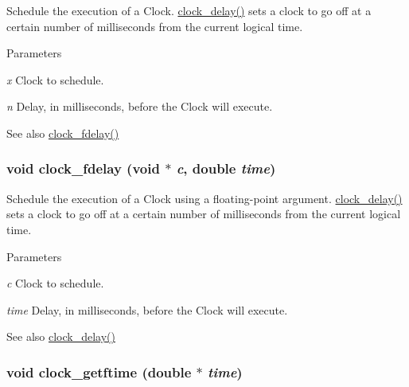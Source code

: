 Schedule the execution of a Clock. \hyperlink{group__clocks_ga9ac56d198904627333de740743086920}{clock\_\-delay()} sets a clock to go off at a certain number of milliseconds from the current logical time.


\begin{DoxyParams}{Parameters}
\item[{\em x}]Clock to schedule. \item[{\em n}]Delay, in milliseconds, before the Clock will execute. \end{DoxyParams}
\begin{DoxySeeAlso}{See also}
\hyperlink{group__clocks_ga61719f0e0379fffbe79ae2bd5699b66f}{clock\_\-fdelay()} 
\end{DoxySeeAlso}
\hypertarget{group__clocks_ga61719f0e0379fffbe79ae2bd5699b66f}{
\subsubsection[{clock\_\-fdelay}]{\setlength{\rightskip}{0pt plus 5cm}void clock\_\-fdelay (void $\ast$ {\em c}, \/  double {\em time})}}
\label{group__clocks_ga61719f0e0379fffbe79ae2bd5699b66f}


Schedule the execution of a Clock using a floating-\/point argument. \hyperlink{group__clocks_ga9ac56d198904627333de740743086920}{clock\_\-delay()} sets a clock to go off at a certain number of milliseconds from the current logical time.


\begin{DoxyParams}{Parameters}
\item[{\em c}]Clock to schedule. \item[{\em time}]Delay, in milliseconds, before the Clock will execute. \end{DoxyParams}
\begin{DoxySeeAlso}{See also}
\hyperlink{group__clocks_ga9ac56d198904627333de740743086920}{clock\_\-delay()} 
\end{DoxySeeAlso}
\hypertarget{group__clocks_ga04a49876d29036406f857cf22b99d9ac}{
\subsubsection[{clock\_\-getftime}]{\setlength{\rightskip}{0pt plus 5cm}void clock\_\-getftime (double $\ast$ {\em time})}}
\label{group__clocks_ga04a49876d29036406f857cf22b99d9ac}


